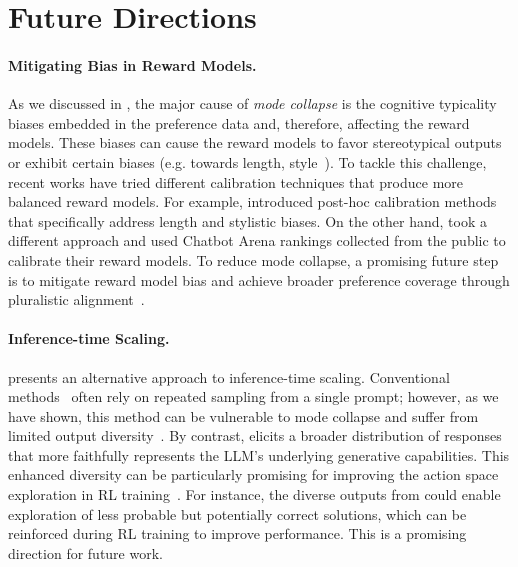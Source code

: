 

\section{Future Directions}\label{sec:future_direction}

\paragraph{Mitigating Bias in Reward Models.} As we discussed in , the major cause of \emph{mode collapse} is the cognitive typicality biases embedded in the preference data and, therefore, affecting the reward models. These biases can cause the reward models to favor stereotypical  outputs or exhibit certain biases (e.g. towards length, style~\citep{liu2024rmbenchbenchmarkingrewardmodels}). To tackle this challenge, recent works have tried different calibration techniques that produce more balanced reward models. For example, \citet{huang2024posthocrewardcalibrationcase} introduced post-hoc calibration methods that specifically address length and stylistic biases. On the other hand, \citet{zhu2025charmcalibratingrewardmodels} took a different approach and used Chatbot Arena rankings collected from the public to calibrate their reward models. To reduce mode collapse, a promising future step is to mitigate reward model bias and achieve broader preference coverage through pluralistic alignment~\citep{sorensen2024roadmappluralisticalignment}. %

\paragraph{Inference-time Scaling.}
\ours presents an alternative approach to inference-time scaling. Conventional methods~\citep{snell_scaling_2024,brown_large_2024} often rely on repeated sampling from a single prompt; however, as we have shown, this method can be vulnerable to mode collapse and suffer from limited output diversity~\citep{yang_how_2025}. By contrast, \ours elicits a broader distribution of responses that more faithfully represents the LLM's underlying generative capabilities. This enhanced diversity can be particularly promising for improving the action space exploration in RL training~\citep{cui2025entropymechanismreinforcementlearning,wang20258020rulehighentropyminority}. For instance, the diverse outputs from \ourslower
could enable exploration of less probable but potentially correct solutions, which can be reinforced during RL training to improve performance. This is a promising direction for future work.

